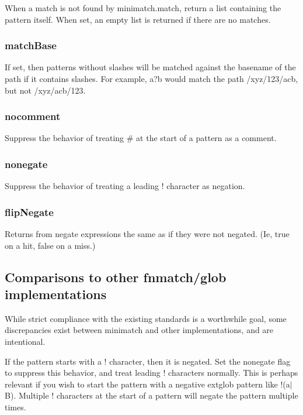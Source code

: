 When a match is not found by {\ttfamily minimatch.\+match}, return a list containing the pattern itself. When set, an empty list is returned if there are no matches.

\subsubsection*{match\+Base}

If set, then patterns without slashes will be matched against the basename of the path if it contains slashes. For example, {\ttfamily a?b} would match the path {\ttfamily /xyz/123/acb}, but not {\ttfamily /xyz/acb/123}.

\subsubsection*{nocomment}

Suppress the behavior of treating {\ttfamily \#} at the start of a pattern as a comment.

\subsubsection*{nonegate}

Suppress the behavior of treating a leading {\ttfamily !} character as negation.

\subsubsection*{flip\+Negate}

Returns from negate expressions the same as if they were not negated. (Ie, true on a hit, false on a miss.)

\subsection*{Comparisons to other fnmatch/glob implementations}

While strict compliance with the existing standards is a worthwhile goal, some discrepancies exist between minimatch and other implementations, and are intentional.

If the pattern starts with a {\ttfamily !} character, then it is negated. Set the {\ttfamily nonegate} flag to suppress this behavior, and treat leading {\ttfamily !} characters normally. This is perhaps relevant if you wish to start the pattern with a negative extglob pattern like {\ttfamily !(a$\vert$B)}. Multiple {\ttfamily !} characters at the start of a pattern will negate the pattern multiple times.

